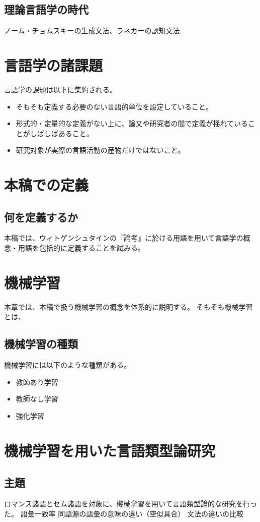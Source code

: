 \documentclass[12pt, oneside]{book} %
\begin{document}
\chapter{理論言語学の時代}
ノーム・チョムスキーの生成文法、ラネカーの認知文法

\part{言語学の諸課題}
言語学の課題は以下に集約される。
\begin{itemize}
    \item そもそも定義する必要のない言語的単位を設定していること。
    \item 形式的・定量的な定義がない上に、論文や研究者の間で定義が揺れていることがしばしばあること。
    \item 研究対象が実際の言語活動の産物だけではないこと。
\end{itemize}
\part{本稿での定義}
\chapter{何を定義するか}
本稿では、ウィトゲンシュタインの『論考』に於ける用語を用いて言語学の概念・用語を包括的に定義することを試みる。
\chapter{}
\part{機械学習}
本章では、本稿で扱う機械学習の概念を体系的に説明する。
そもそも機械学習とは、
\chapter{機械学習の種類}
機械学習には以下のような種類がある。
\begin{itemize}
    \item 教師あり学習
    \item 教師なし学習
    \item 強化学習
\end{itemize}
\part{機械学習を用いた言語類型論研究}
\chapter{主題}
ロマンス諸語とセム諸語を対象に、機械学習を用いて言語類型論的な研究を行った。
語彙一致率
同語源の語彙の意味の違い（空似具合）
文法の違いの比較
\end{document}
